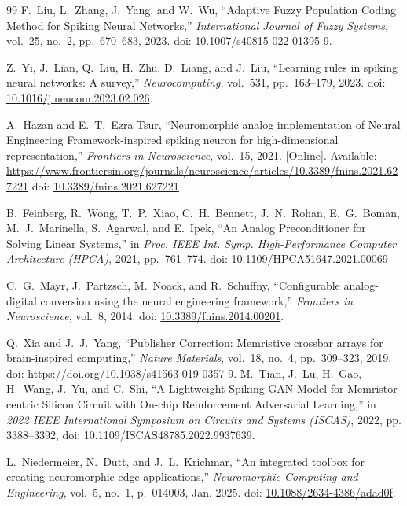 \documentclass[letter, 12pt]{article}
\begin{document}
\begin{thebibliography}{99}
F.~Liu, L.~Zhang, J.~Yang, and W.~Wu,
``Adaptive Fuzzy Population Coding Method for Spiking Neural Networks,''
\textit{International Journal of Fuzzy Systems},
vol.~25, no.~2, pp.~670--683, 2023.
doi: \href{https://doi.org/10.1007/s40815-022-01395-9}{10.1007/s40815-022-01395-9}.

Z.~Yi, J.~Lian, Q.~Liu, H.~Zhu, D.~Liang, and J.~Liu,
``Learning rules in spiking neural networks: A survey,''
\emph{Neurocomputing}, vol.~531, pp.~163--179, 2023.
doi: \href{https://doi.org/10.1016/j.neucom.2023.02.026}{10.1016/j.neucom.2023.02.026}.

A.~Hazan and E.~T.~Ezra Tsur,
``Neuromorphic analog implementation of Neural Engineering Framework-inspired spiking neuron for high-dimensional representation,''
\emph{Frontiers in Neuroscience}, vol.~15, 2021.
[Online]. Available: \url{https://www.frontiersin.org/journals/neuroscience/articles/10.3389/fnins.2021.627221}
doi: \href{https://doi.org/10.3389/fnins.2021.627221}{10.3389/fnins.2021.627221}

B.~Feinberg, R.~Wong, T.~P.~Xiao, C.~H.~Bennett, J.~N.~Rohan, E.~G.~Boman, M.~J.~Marinella, S.~Agarwal, and E.~Ipek,
``An Analog Preconditioner for Solving Linear Systems,''
in \emph{Proc. IEEE Int. Symp. High-Performance Computer Architecture (HPCA)}, 2021, pp.~761--774.
doi: \href{https://doi.org/10.1109/HPCA51647.2021.00069}{10.1109/HPCA51647.2021.00069}

C.~G.~Mayr, J.~Partzsch, M.~Noack, and R.~Schüffny,
``Configurable analog-digital conversion using the neural engineering framework,''
\emph{Frontiers in Neuroscience}, vol.~8, 2014.
doi: \href{https://doi.org/10.3389/fnins.2014.00201}{10.3389/fnins.2014.00201}.

Q.~Xia and J.~J.~Yang,
``Publisher Correction: Memristive crossbar arrays for brain-inspired computing,''
\textit{Nature Materials},
vol.~18, no.~4, pp.~309--323, 2019.
doi: \href{https://doi.org/10.1038/s41563-019-0357-9}{https://doi.org/10.1038/s41563-019-0357-9}.
M.~Tian, J.~Lu, H.~Gao, H.~Wang, J.~Yu, and C.~Shi,
``A Lightweight Spiking GAN Model for Memristor-centric Silicon Circuit with On-chip Reinforcement Adversarial Learning,''
in \textit{2022 IEEE International Symposium on Circuits and Systems (ISCAS)}, 2022, pp. 3388--3392, doi: 10.1109/ISCAS48785.2022.9937639.

L.~Niedermeier, N.~Dutt, and J.~L.~Krichmar,
``An integrated toolbox for creating neuromorphic edge applications,''
\textit{Neuromorphic Computing and Engineering},
vol.~5, no.~1, p.~014003, Jan. 2025.
doi: \href{https://doi.org/10.1088/2634-4386/adad0f}{10.1088/2634-4386/adad0f}.


\end{thebibliography}
\end{document}
